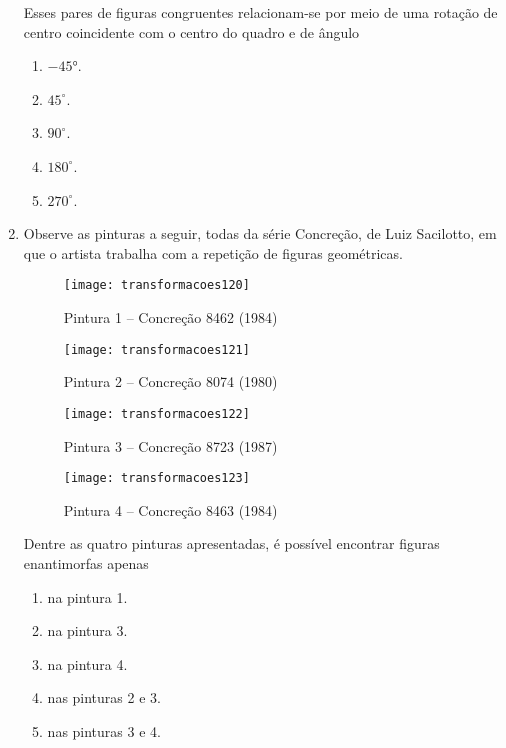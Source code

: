 \begin{enumerate}
Esses pares de figuras congruentes relacionam-se por meio de uma rotação de centro coincidente com o centro do quadro e de ângulo
\begin{enumerate}
\item $-45°$.
\item $45^{\circ}$.
\item $90^{\circ}$.
\item $180^{\circ}$.
\item $270^{\circ}$.
\end{enumerate}


\item Observe as pinturas a seguir, todas da série Concreção, de Luiz Sacilotto, em que o artista trabalha com a repetição de figuras geométricas. 


\begin{multicols}{2}
\begin{figure}[H]
\centering

\texttt{[image: transformacoes120]}
\caption{Pintura 1 – Concreção 8462 (1984)}
\label{}
\end{figure}
\begin{figure}[H]
\centering

\texttt{[image: transformacoes121]}
\caption{Pintura 2 – Concreção 8074 (1980)}
\label{}
\end{figure}
\begin{figure}[H]
\centering

\texttt{[image: transformacoes122]}
\caption{Pintura 3 – Concreção 8723 (1987)}
\label{}
\end{figure}
\begin{figure}[H]
\centering

\texttt{[image: transformacoes123]}
\caption{Pintura 4 – Concreção 8463 (1984)}
\label{}
\end{figure}
\end{multicols}

Dentre as quatro pinturas apresentadas, é possível encontrar figuras enantimorfas apenas 
\begin{enumerate}
\item na pintura 1.
\item na pintura 3.
\item na pintura 4. 
\item nas pinturas 2 e 3.
\item nas pinturas 3 e 4.
\end{enumerate}



\end{enumerate}

